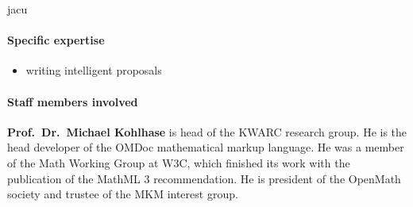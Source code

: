 \begin{sitedescription}{jacu}
\paragraph{Specific expertise}

\begin{itemize}
\item writing intelligent proposals
\end{itemize}

\paragraph{Staff members involved}

\textbf{Prof.\ Dr.\ Michael Kohlhase} is head of the KWARC research
group.  He is the head developer of the OMDoc mathematical markup
language.  He was a member of the Math Working Group at W3C, which finished its work with the publication of the MathML 3 recommendation.  He is president of the OpenMath society and trustee of the MKM
interest group.

\end{sitedescription}


